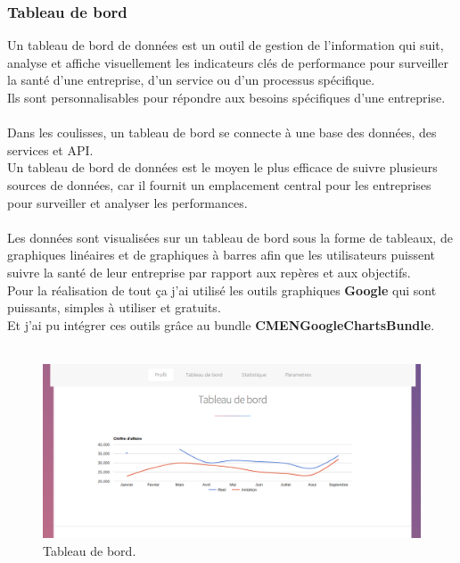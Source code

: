 \documentclass[12pt]{article}
\begin{document}
\subsubsection{Tableau de bord}
 
Un tableau de bord de données est un outil de gestion de l'information qui suit, analyse et affiche visuellement les indicateurs clés de performance  pour surveiller la santé d'une entreprise, d'un service ou d'un processus spécifique. \\
Ils sont personnalisables pour répondre aux besoins spécifiques  d'une entreprise.\\
\\


 Dans les coulisses, un tableau de bord se connecte à une 
 base des données, des services et API.\\
  Un tableau de bord de données est le moyen le plus efficace de suivre plusieurs sources de données, car il fournit un emplacement central pour les entreprises pour surveiller et analyser les performances.\\
  \\
   
Les données sont visualisées sur un tableau de bord sous la forme de tableaux, de graphiques linéaires et de graphiques à barres  afin que les utilisateurs puissent suivre la santé de leur entreprise par rapport aux repères et aux objectifs. \\
Pour la  réalisation de tout ça j'ai utilisé les outils graphiques \textbf{Google} qui sont puissants, simples à utiliser et gratuits.\\
Et j'ai pu intégrer ces outils grâce au bundle \textbf{CMENGoogleChartsBundle}.\\ \\
\begin{center}
\begin{figure}[htp]
  \centering
  \includegraphics[width=12cm]{pg2.png}
  \caption{Tableau de bord.}
  \label{fig:une-autre-image}
\end{figure}
\end{center}
\end{document}
